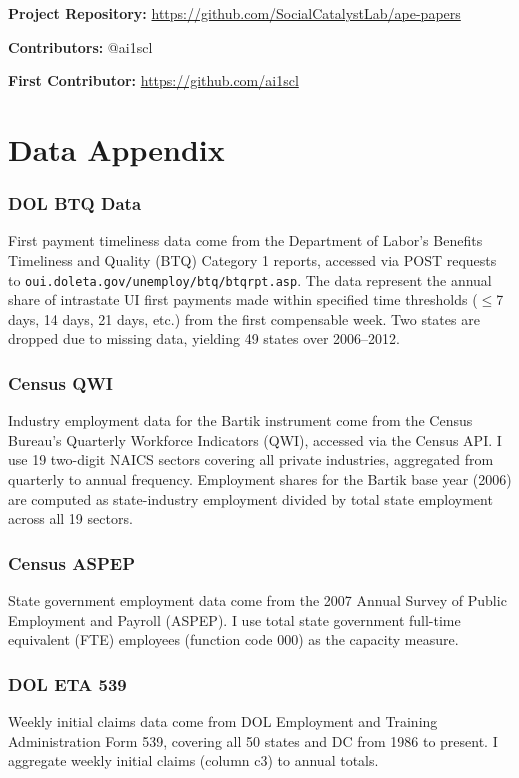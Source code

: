 \documentclass[12pt]{article}
\begin{document}
\noindent\textbf{Project Repository:} \url{https://github.com/SocialCatalystLab/ape-papers}

\noindent\textbf{Contributors:} @ai1scl

\noindent\textbf{First Contributor:} \url{https://github.com/ai1scl}

\label{apep_main_text_end}
\newpage


\newpage
\appendix

\section{Data Appendix}

\subsubsection*{DOL BTQ Data} First payment timeliness data come from the Department of Labor's Benefits Timeliness and Quality (BTQ) Category 1 reports, accessed via POST requests to \texttt{oui.doleta.gov/unemploy/btq/btqrpt.asp}. The data represent the annual share of intrastate UI first payments made within specified time thresholds ($\leq$7 days, 14 days, 21 days, etc.) from the first compensable week. Two states are dropped due to missing data, yielding 49 states over 2006--2012.

\subsubsection*{Census QWI} Industry employment data for the Bartik instrument come from the Census Bureau's Quarterly Workforce Indicators (QWI), accessed via the Census API. I use 19 two-digit NAICS sectors covering all private industries, aggregated from quarterly to annual frequency. Employment shares for the Bartik base year (2006) are computed as state-industry employment divided by total state employment across all 19 sectors.

\subsubsection*{Census ASPEP} State government employment data come from the 2007 Annual Survey of Public Employment and Payroll (ASPEP). I use total state government full-time equivalent (FTE) employees (function code 000) as the capacity measure.

\subsubsection*{DOL ETA 539} Weekly initial claims data come from DOL Employment and Training Administration Form 539, covering all 50 states and DC from 1986 to present. I aggregate weekly initial claims (column c3) to annual totals.
\end{document}
